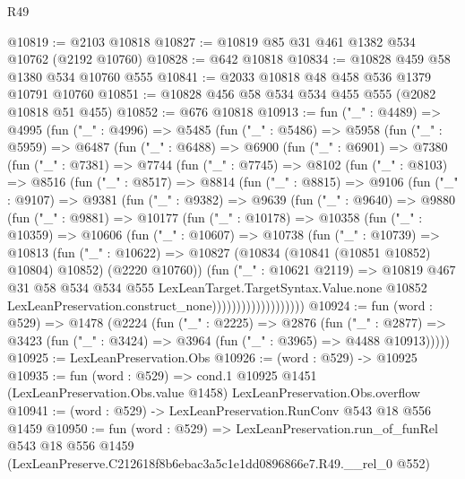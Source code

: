 \begin{lexlean}{R49}
\begin{coremodule}
@10819 := @2103 @10818
@10827 := @10819 @85 @31 @461 @1382 @534 @10762 (@2192 @10760)
@10828 := @642 @10818
@10834 := @10828 @459 @58 @1380 @534 @10760 @555
@10841 := @2033 @10818 @48 @458 @536 @1379 @10791 @10760
@10851 := @10828 @456 @58 @534 @534 @455 @555 (@2082 @10818 @51 @455)
@10852 := @676 @10818
@10913 := fun ("_" : @4489) =>
  @4995
    (fun ("_" : @4996) =>
    @5485
      (fun ("_" : @5486) =>
      @5958
        (fun ("_" : @5959) =>
        @6487
          (fun ("_" : @6488) =>
          @6900
            (fun ("_" : @6901) =>
            @7380
              (fun ("_" : @7381) =>
              @7744
                (fun ("_" : @7745) =>
                @8102
                  (fun ("_" : @8103) =>
                  @8516
                    (fun ("_" : @8517) =>
                    @8814
                      (fun ("_" : @8815) =>
                      @9106
                        (fun ("_" : @9107) =>
                        @9381
                          (fun ("_" : @9382) =>
                          @9639
                            (fun ("_" : @9640) =>
                            @9880
                              (fun ("_" : @9881) =>
                              @10177
                                (fun ("_" : @10178) =>
                                @10358
                                  (fun ("_" : @10359) =>
                                  @10606
                                    (fun ("_" : @10607) =>
                                    @10738
                                      (fun ("_" : @10739) =>
                                      @10813
                                        (fun ("_" : @10622) =>
                                        @10827
                                          (@10834 (@10841 (@10851 @10852) @10804) @10852)
                                          (@2220 @10760))
                                        (fun ("_" : @10621 @2119) =>
                                        @10819
                                          @467
                                          @31
                                          @58
                                          @534
                                          @534
                                          @555
                                          LexLeanTarget.TargetSyntax.Value.none
                                          @10852
                                          LexLeanPreservation.construct_none)))))))))))))))))))
@10924 := fun (word : @529) =>
  @1478
    (@2224
      (fun ("_" : @2225) =>
      @2876
        (fun ("_" : @2877) =>
        @3423 (fun ("_" : @3424) => @3964 (fun ("_" : @3965) => @4488 @10913)))))
@10925 := LexLeanPreservation.Obs
@10926 := (word : @529) -> @10925
@10935 := fun (word : @529) =>
  cond.{1} @10925 @1451 (LexLeanPreservation.Obs.value @1458) LexLeanPreservation.Obs.overflow
@10941 := (word : @529) -> LexLeanPreservation.RunConv @543 @18 @556 @1459
@10950 := fun (word : @529) =>
  LexLeanPreservation.run_of_funRel
    @543
    @18
    @556
    @1459
    (LexLeanPreserve.C212618f8b6ebac3a5c1e1dd0896866e7.R49.__rel_0 @552)
\end{coremodule}
\end{lexlean}
